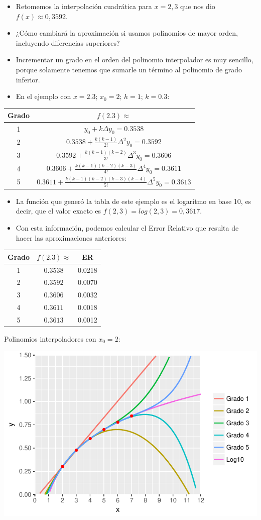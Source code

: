 \documentclass[openany]{book}
\providecommand{\tightlist}{%
  \setlength{\itemsep}{0pt}\setlength{\parskip}{0pt}}
\begin{document}
\begin{itemize}
\tightlist
\item
  Retomemos la interpolación cuadrática para \(x=2,3\) que nos dio \(f(x) \approx 0,3592\).
\item
  ¿Cómo cambiará la aproximación si usamos polinomios de mayor orden, incluyendo diferencias superiores?
\item
  Incrementar un grado en el orden del polinomio interpolador es muy sencillo, porque solamente tenemos que sumarle un término al polinomio de grado inferior.
\item
  En el ejemplo con \(x = 2.3\); \(x_0=2\); \(h = 1\); \(k = 0.3\):
\end{itemize}

\begin{longtable}[]{@{}cc@{}}
\toprule
Grado & \(f(2.3) \approx\)\tabularnewline
\midrule
\endhead
1 & \(y_0 + k \Delta y_0 = 0.3538\)\tabularnewline
2 & \(0.3538 + \frac{k(k-1)}{2!}\Delta^2 y_0 = 0.3592\)\tabularnewline
3 & \(0.3592 + \frac{k(k-1)(k-2)}{3!}\Delta^3 y_0 = 0.3606\)\tabularnewline
4 & \(0.3606 + \frac{k(k-1)(k-2)(k-3)}{4!}\Delta^4 y_0 = 0.3611\)\tabularnewline
5 & \(0.3611 + \frac{k(k-1)(k-2)(k-3)(k-4)}{5!}\Delta^5 y_0 = 0.3613\)\tabularnewline
\bottomrule
\end{longtable}

\begin{itemize}
\tightlist
\item
  La función que generó la tabla de este ejemplo es el logaritmo en base 10, es decir, que el valor exacto es \(f(2,3) = log(2,3) = 0,3617\).
\item
  Con esta información, podemos calcular el Error Relativo que resulta de hacer las aproximaciones anteriores:
\end{itemize}

\begin{longtable}[]{@{}ccc@{}}
\toprule
Grado & \(f(2.3) \approx\) & ER\tabularnewline
\midrule
\endhead
1 & \(0.3538\) & 0.0218\tabularnewline
2 & \(0.3592\) & 0.0070\tabularnewline
3 & \(0.3606\) & 0.0032\tabularnewline
4 & \(0.3611\) & 0.0018\tabularnewline
5 & \(0.3613\) & 0.0012\tabularnewline
\bottomrule
\end{longtable}

Polinomios interpoladores con \(x_0=2\):

\begin{center}\includegraphics[width=0.9\linewidth]{Plots/U4/Unidad4_g4} \end{center}
\end{document}
